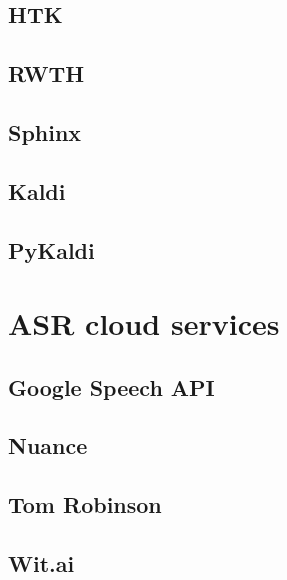 \subsection{HTK}
\blindtext

\subsection{RWTH}
\blindtext

\subsection{Sphinx}
\blindtext

\subsection{Kaldi}
\blindtext

\subsection{PyKaldi}
\blindtext


\section{ASR cloud services}
\blindtext

\subsection{Google Speech API}
\blindtext

\subsection{Nuance}
\blindtext

\subsection{Tom Robinson}
\blindtext

\subsection{Wit.ai}
\blindtext

